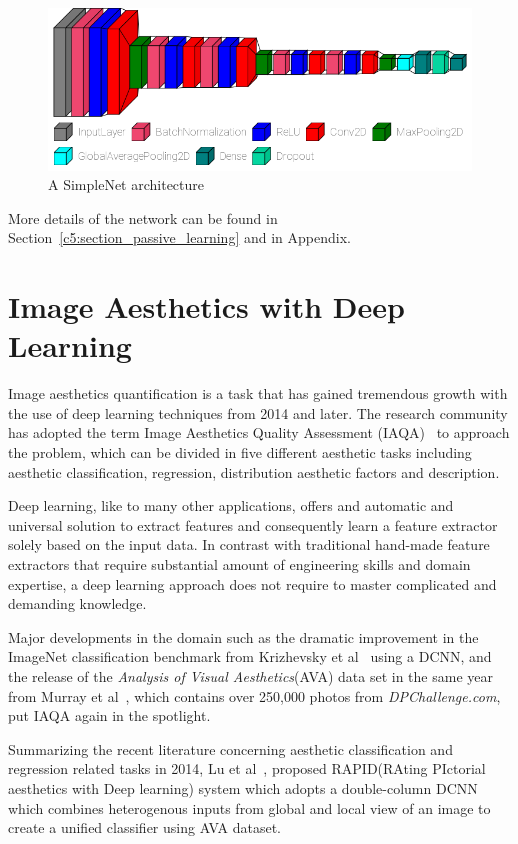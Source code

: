 \begin{figure}[h!]
    \centering  
    \includegraphics[width=.7\textwidth]{figures/chap3/cnn/architectures/simplenet_arch}
    \caption{A SimpleNet architecture}
    \label{c3:simplenet_arch}
\end{figure}

More details of the network can be found in Section~\ref{c5:section_passive_learning} and in Appendix.


\section{Image Aesthetics with Deep Learning}
\label{c3:section_aesthetics_deep}
Image aesthetics quantification is a task that has gained tremendous growth with the use of deep learning techniques from 2014 and later. The research community has adopted the term Image Aesthetics Quality Assessment (IAQA)~\cite{yang2019comprehensive} to approach the problem, which can be divided in five different aesthetic tasks including aesthetic classification, regression, distribution aesthetic factors and description.

Deep learning, like to many other applications, offers and automatic and universal solution to extract features and consequently learn a feature extractor solely based on the input data. In contrast with traditional hand-made feature extractors that require substantial amount of engineering skills and domain expertise, a deep learning approach does not require to master complicated and demanding knowledge.

Major developments in the domain such as the dramatic improvement in the ImageNet classification benchmark from Krizhevsky et al~\cite{krizhevsky2012imagenet} using a DCNN, and the release of the \textit{Analysis of Visual Aesthetics}(AVA) data set in the same year from Murray et al~\cite{murray2012ava}, which contains over 250,000 photos from \textit{DPChallenge.com}, put IAQA again in the spotlight.

Summarizing the recent literature concerning aesthetic classification and regression related tasks in 2014, Lu et al~\cite{lu2014rapid}, proposed RAPID(RAting PIctorial aesthetics with Deep learning) system which adopts a double-column DCNN which combines heterogenous inputs from global and local view of an image to create a unified classifier using AVA dataset.

